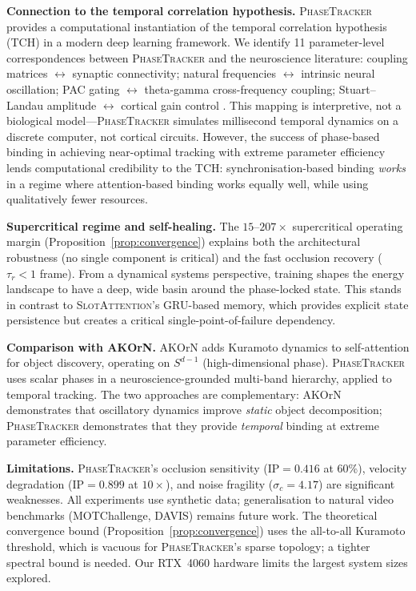 \documentclass[11pt]{article}
\providecommand{\pt}{\textnormal{\textsc{PhaseTracker}}\xspace}
\providecommand{\sa}{\textnormal{\textsc{SlotAttention}}\xspace}
\providecommand{\ip}{\text{IP}}
\begin{document}
\textbf{Connection to the temporal correlation hypothesis.}
\pt provides a computational instantiation of
the temporal correlation hypothesis (TCH) in a modern deep learning
framework.  We identify 11 parameter-level correspondences between
\pt and the neuroscience literature: coupling matrices $\leftrightarrow$
synaptic connectivity; natural frequencies $\leftrightarrow$ intrinsic
neural oscillation; PAC gating $\leftrightarrow$ theta-gamma
cross-frequency coupling; Stuart--Landau amplitude
$\leftrightarrow$ cortical gain control
\citep{vonDerMalsburg1981,singer1995visual,engel2001dynamic,fries2005mechanism,fries2015rhythms}.
This mapping is interpretive, not a biological model---\pt
simulates millisecond temporal dynamics on a discrete computer, not
cortical circuits.  However, the success of phase-based binding in
achieving near-optimal tracking with extreme parameter efficiency
lends computational credibility to the TCH: synchronisation-based
binding \emph{works} in a regime where attention-based binding works
equally well, while using qualitatively fewer resources.

\textbf{Supercritical regime and self-healing.}
The $15$--$207\times$ supercritical operating margin
(Proposition~\ref{prop:convergence}) explains both the architectural
robustness (no single component is critical) and the fast occlusion
recovery ($\tau_r < 1$ frame).  From a dynamical systems perspective,
training shapes the energy landscape to have a deep, wide basin around
the phase-locked state.  This stands in contrast to \sa's GRU-based
memory, which provides explicit state persistence but creates a
critical single-point-of-failure dependency.

\textbf{Comparison with AKOrN.}
AKOrN \citep{miyato2025akorn} adds Kuramoto dynamics to
self-attention for object discovery, operating on $S^{d-1}$
(high-dimensional phase).  \pt uses scalar phases in a neuroscience-grounded
multi-band hierarchy, applied to temporal tracking.  The two approaches
are complementary: AKOrN demonstrates that oscillatory dynamics improve
\emph{static} object decomposition; \pt demonstrates that they provide
\emph{temporal} binding at extreme parameter efficiency.

\textbf{Limitations.}
\pt's occlusion sensitivity ($\ip = 0.416$ at 60\%), velocity
degradation ($\ip = 0.899$ at $10\times$), and noise fragility
($\sigma_c = 4.17$) are significant weaknesses.  All experiments
use synthetic data; generalisation to natural video benchmarks
(MOTChallenge, DAVIS) remains future work.  The theoretical
convergence bound (Proposition~\ref{prop:convergence}) uses the
all-to-all Kuramoto threshold, which is vacuous for \pt's sparse
topology; a tighter spectral bound is needed.  Our RTX~4060 hardware
limits the largest system sizes explored.
\end{document}
